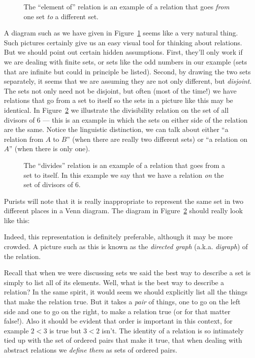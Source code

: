 \begin{figure}[!hbtp]

\caption[An example of a relation.]{The ``element of'' relation %
is an example of a relation that goes \emph{from} one set \emph{to} a %
different set.}
\label{fig:rel1} 
\end{figure}

A diagram such as we have given in Figure~\ref{fig:rel1} seems like a 
very natural thing.  Such pictures certainly give us an easy visual 
tool for thinking
about relations.  But we should point out certain hidden assumptions.
First, they'll only work if we are dealing with finite sets, or sets
like the odd numbers in our example (sets that are infinite but could
in principle be listed).  Second, by drawing the two sets separately,
it seems that we are assuming they are not only different, but 
\emph{disjoint}.  The sets not only need not be disjoint, but often
(most of the time!) we have relations that go from a set to itself
so the sets in a picture like this may be identical.  In Figure~\ref{fig:rel2}
we illustrate the divisibility relation on the set of all divisors of
6 --- this is an example in which the sets on either side of the relation
are the same.  Notice the linguistic distinction, we can talk about
either ``a relation from $A$ to $B$'' (when there are really two 
different sets) or ``a relation on $A$'' (when there is only one). 

\begin{figure}[!hbtp]

\caption[An example of the ``divides'' relation.]{The ``divides'' relation %
is an example of a relation that goes from a set to itself.  In this example %
we say that we have a relation \emph{on} the set of divisors of 6.}
\label{fig:rel2} 
\end{figure}
 
Purists will note that it is really inappropriate to represent the same set
in two different places in a Venn diagram.  The diagram in Figure~\ref{fig:rel2}
should really look like this:

\begin{center}

\end{center}

Indeed, this representation is definitely preferable, although it may be more crowded.  
A picture such as this is
known as the \emph{directed graph} (a.k.a. \emph{digraph})
of the relation.

Recall that when we were discussing sets we said the best way to describe 
a set is simply to list all of its elements.  Well, what is the best
way to describe a relation?  In the same spirit, it would seem we should
explicitly list all the things that make the relation true.  But it takes
a \emph{pair} of things, one to go on the left side and one to go on the 
right, to make a relation true (or for that matter false!).  Also it should 
be evident that order is important in this context, for example $2<3$ is true
but $3<2$ isn't.  The identity of a relation is so intimately tied up with
the set of ordered pairs that make it true, that when dealing with abstract
relations we \emph{define them} as sets of ordered pairs.

